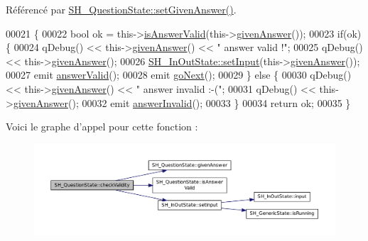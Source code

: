 Référencé par \hyperlink{classSH__QuestionState_a8fec0a91aed0b2b1699db17169873eb0}{S\-H\-\_\-\-Question\-State\-::set\-Given\-Answer()}.


\begin{DoxyCode}
00021 \{
00022     \textcolor{keywordtype}{bool} ok = this->\hyperlink{classSH__QuestionState_a8780740599e2e183560a670ff9874708}{isAnswerValid}(this->\hyperlink{classSH__QuestionState_a29cdea8bc55e39e3ed02d24743c30f8c}{givenAnswer}());
00023     \textcolor{keywordflow}{if}(ok) \{
00024         qDebug() << this->\hyperlink{classSH__QuestionState_a29cdea8bc55e39e3ed02d24743c30f8c}{givenAnswer}() << \textcolor{stringliteral}{" answer valid !"};
00025         qDebug() << this->\hyperlink{classSH__QuestionState_a29cdea8bc55e39e3ed02d24743c30f8c}{givenAnswer}();
00026         \hyperlink{classSH__InOutState_aaec9c2b5ef7c406bff7469461352d47c}{SH\_InOutState::setInput}(this->\hyperlink{classSH__QuestionState_a29cdea8bc55e39e3ed02d24743c30f8c}{givenAnswer}());
00027         emit \hyperlink{classSH__QuestionState_a04e259643788d15ab6244bc8a04286d6}{answerValid}();
00028         emit \hyperlink{classSH__GenericState_a34c1bebc765cc3a62d66c94c37d4f0c3}{goNext}();
00029     \} \textcolor{keywordflow}{else} \{
00030         qDebug() << this->\hyperlink{classSH__QuestionState_a29cdea8bc55e39e3ed02d24743c30f8c}{givenAnswer}() << \textcolor{stringliteral}{" answer invalid :-("};
00031         qDebug() << this->\hyperlink{classSH__QuestionState_a29cdea8bc55e39e3ed02d24743c30f8c}{givenAnswer}();
00032         emit \hyperlink{classSH__QuestionState_a3348a8a683130678ac87a10ba2a25486}{answerInvalid}();
00033     \}
00034     \textcolor{keywordflow}{return} ok;
00035 \}
\end{DoxyCode}


Voici le graphe d'appel pour cette fonction \-:\nopagebreak
\begin{figure}[H]
\begin{center}
\leavevmode
\includegraphics[width=350pt]{classSH__QuestionState_a902be003650c33d954d707b2d3ee0bb9_cgraph}
\end{center}
\end{figure}




